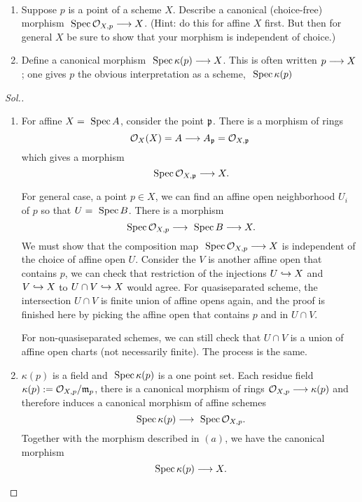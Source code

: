 \documentclass[11pt]{book} %
\begin{document}
\begin{exr}\label{chap6exr:morphism_of_schemes_stalk_to_X}
\ \begin{enumerate}[label=(\alph*)]
\item Suppose $p$ is a point of a scheme $X$. Describe a canonical (choice-free) morphism $\text{ Spec\,} {\cal O}_{X,p}\longrightarrow X$. (Hint: do this for affine $X$ first. But then for general $X$ be sure to show that your morphism is independent of choice.)
\item Define a canonical morphism $\text{ Spec\,} \kappa(p)\longrightarrow X$. This is often written $p\longrightarrow X$; one gives $p$ the obvious interpretation as a scheme, $\text{ Spec\,} \kappa(p)$
\end{enumerate}
\end{exr}
\begin{proof}[Sol.]
\begin{enumerate}[label=(\alph*)]
\item For affine $X=\text{ Spec\,} A$, consider the point ${\mathfrak p}$. There is a morphism of rings 
$$
{\cal O}_X(X)=A\longrightarrow A_{\mathfrak p}={\cal O}_{X,{\mathfrak p}}
$$
which gives a morphism
$$
\text{ Spec\,} {\cal O}_{X,{\mathfrak p}}\longrightarrow X.
$$

For general case, a point $p\in X$, we can find an affine open neighborhood $U_i$ of $p$ so that $U=\text{ Spec\,} B$. There is a morphism
$$
\text{ Spec\,} {\cal O}_{X,p}\longrightarrow \text{ Spec\,} B\longrightarrow X.
$$
We must show that the composition map $\text{ Spec\,} {\cal O}_{X,p}\longrightarrow X$ is independent of the choice of affine open $U$. Consider the $V$ is another affine open that contains $p$, we can check that restriction of the injections $U\hookrightarrow X$ and $V\hookrightarrow X$ to $U\cap V\hookrightarrow X$ would agree. For quasiseparated scheme, the intersection $U\cap V$ is finite union of affine opens again, and the proof is finished here by picking the affine open that contains $p$ and in $U\cap V$. 

For non-quasiseparated schemes, we can still check that $U\cap V$ is a union of affine open charts (not necessarily finite). The process is the same.
 
\item $\kappa(p)$ is a field and $\text{ Spec\,} \kappa(p)$ is a one point set. Each residue field $\kappa(p):={\cal O}_{X,p}/{\mathfrak m}_p$, there is a canonical morphism of rings ${\cal O}_{X,p}\longrightarrow \kappa(p)$ and therefore induces a canonical morphism of affine schemes
$$
\text{ Spec\,} \kappa(p)\longrightarrow \text{ Spec\,} {\cal O}_{X,p}.
$$
Together with the morphism described in $(a)$, we have the canonical morphism
$$
\text{ Spec\,} \kappa(p)\longrightarrow X.
$$
\end{enumerate}
\end{proof}
\end{document}
